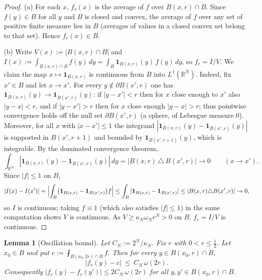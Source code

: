 \documentclass{amsart}
\newtheorem{lemma}{Lemma}
\theoremstyle{definition}
\begin{document}
\begin{proof}
(a) For each $x$, $f_r(x)$ is the average of $f$ over $B(x,r)\cap B$. Since
$f(y)\in B$ for all $y$ and $B$ is closed and convex, the average of $f$ over any
set of positive finite measure lies in $B$ (averages of values in a closed convex
set belong to that set). Hence $f_r(x)\in B$.

(b) Write $V(x):=|B(x,r)\cap B|$ and $I(x):=\int_{B(x,r)\cap B}f(y)\,dy
=\int_B \mathbf 1_{B(x,r)}(y)\,f(y)\,dy$, so $f_r=I/V$. We claim the map
$x\mapsto \mathbf 1_{B(x,r)}$ is continuous from $B$ into $L^1(\mathbb{R}^N)$.
Indeed, fix $x'\in B$ and let $x\to x'$. For every
$y\notin\partial B(x',r)$ one has $\mathbf 1_{B(x,r)}(y)\to\mathbf 1_{B(x',r)}(y)$:
if $|y-x'|<r$ then for $x$ close enough to $x'$ also $|y-x|<r$, and if
$|y-x'|>r$ then for $x$ close enough $|y-x|>r$; thus pointwise convergence holds
off the null set $\partial B(x',r)$ (a sphere, of Lebesgue measure $0$). Moreover,
for all $x$ with $|x-x'|\le 1$ the integrand
$|\mathbf 1_{B(x,r)}(y)-\mathbf 1_{B(x',r)}(y)|$ is supported in
$B(x',r+1)$ and bounded by $\mathbf 1_{B(x',r+1)}(y)$, which is integrable. By the
dominated convergence theorem,
\[
\int_{\mathbb{R}^N}|\mathbf 1_{B(x,r)}(y)-\mathbf 1_{B(x',r)}(y)|\,dy
=|B(x,r)\,\triangle\,B(x',r)|\longrightarrow0\qquad(x\to x').
\]
Since $|f|\le1$ on $B$,
\[
|I(x)-I(x')|=\Bigl|\int_B\bigl(\mathbf 1_{B(x,r)}-\mathbf 1_{B(x',r)}\bigr)f\Bigr|
\le\int_B|\mathbf 1_{B(x,r)}-\mathbf 1_{B(x',r)}|
\le |B(x,r)\triangle B(x',r)|\to0,
\]
so $I$ is continuous; taking $f\equiv1$ (which also satisfies $|f|\le1$) in the
same computation shows $V$ is continuous. As $V\ge\kappa_N\omega_N r^N>0$ on $B$,
$f_r=I/V$ is continuous.
\end{proof}

\begin{lemma}[Oscillation bound]\label{lem:osc}
Let $C_N:=2^{N}/\kappa_N$. Fix $r$ with $0<r\le\tfrac12$. Let $x_0\in B$ and put
$c:=\fint_{B(x_0,2r)\cap B}f$. Then for every $y\in B(x_0,r)\cap B$,
\begin{equation}\label{eq:osc}
|f_r(y)-c|\ \le\ C_N\,\omega(2r).
\end{equation}
Consequently $|f_r(y)-f_r(y')|\le 2C_N\,\omega(2r)$ for all $y,y'\in
B(x_0,r)\cap B$.
\end{lemma}
\end{document}

